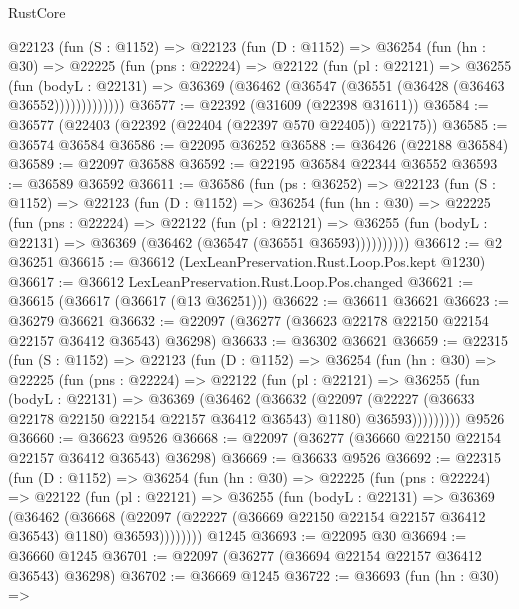\begin{lexlean}{RustCore}
\begin{coremodule}
      @22123
        (fun (S : @1152) =>
        @22123
          (fun (D : @1152) =>
          @36254
            (fun (hn : @30) =>
            @22225
              (fun (pns : @22224) =>
              @22122
                (fun (pl : @22121) =>
                @36255
                  (fun (bodyL : @22131) =>
                  @36369 (@36462 (@36547 (@36551 (@36428 (@36463 @36552)))))))))))))
@36577 := @22392 (@31609 (@22398 @31611))
@36584 := @36577 (@22403 (@22392 (@22404 (@22397 @570 @22405)) @22175))
@36585 := @36574 @36584
@36586 := @22095 @36252
@36588 := @36426 (@22188 @36584)
@36589 := @22097 @36588
@36592 := @22195 @36584 @22344 @36552
@36593 := @36589 @36592
@36611 := @36586
    (fun (ps : @36252) =>
    @22123
      (fun (S : @1152) =>
      @22123
        (fun (D : @1152) =>
        @36254
          (fun (hn : @30) =>
          @22225
            (fun (pns : @22224) =>
            @22122
              (fun (pl : @22121) =>
              @36255 (fun (bodyL : @22131) => @36369 (@36462 (@36547 (@36551 @36593))))))))))
@36612 := @2 @36251
@36615 := @36612 (LexLeanPreservation.Rust.Loop.Pos.kept @1230)
@36617 := @36612 LexLeanPreservation.Rust.Loop.Pos.changed
@36621 := @36615 (@36617 (@36617 (@13 @36251)))
@36622 := @36611 @36621
@36623 := @36279 @36621
@36632 := @22097 (@36277 (@36623 @22178 @22150 @22154 @22157 @36412 @36543) @36298)
@36633 := @36302 @36621
@36659 := @22315
    (fun (S : @1152) =>
    @22123
      (fun (D : @1152) =>
      @36254
        (fun (hn : @30) =>
        @22225
          (fun (pns : @22224) =>
          @22122
            (fun (pl : @22121) =>
            @36255
              (fun (bodyL : @22131) =>
              @36369
                (@36462
                  (@36632
                    (@22097
                      (@22227 (@36633 @22178 @22150 @22154 @22157 @36412 @36543) @1180)
                      @36593)))))))))
    @9526
@36660 := @36623 @9526
@36668 := @22097 (@36277 (@36660 @22150 @22154 @22157 @36412 @36543) @36298)
@36669 := @36633 @9526
@36692 := @22315
    (fun (D : @1152) =>
    @36254
      (fun (hn : @30) =>
      @22225
        (fun (pns : @22224) =>
        @22122
          (fun (pl : @22121) =>
          @36255
            (fun (bodyL : @22131) =>
            @36369
              (@36462
                (@36668
                  (@22097 (@22227 (@36669 @22150 @22154 @22157 @36412 @36543) @1180) @36593))))))))
    @1245
@36693 := @22095 @30
@36694 := @36660 @1245
@36701 := @22097 (@36277 (@36694 @22154 @22157 @36412 @36543) @36298)
@36702 := @36669 @1245
@36722 := @36693
    (fun (hn : @30) =>

\end{coremodule}
\end{lexlean}
